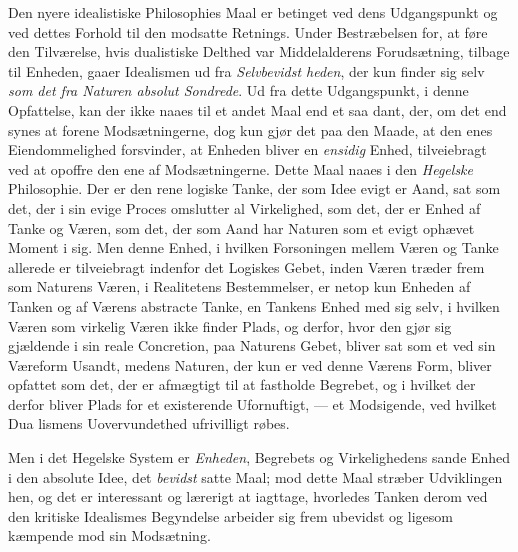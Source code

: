 Den nyere idealistiske Philosophies Maal er betinget ved
dens Udgangspunkt og ved dettes Forhold til den modsatte
Retnings. Under Bestræbelsen for, at føre den Tilværelse,
hvis dualistiske Delthed var Middelalderens Forudsætning,
tilbage til Enheden, gaaer Idealismen ud fra \emph{Selvbevidst\-%
heden}, der kun finder sig selv \emph{som det fra Naturen
absolut Sondrede}. Ud fra dette Udgangspunkt, i denne
Opfattelse, kan der ikke naaes til et andet Maal end et saa\-%
dant, der, om det end synes at forene Modsætningerne, dog
kun gjør det paa den Maade, at den enes Eiendommelighed
forsvinder, at Enheden bliver en \emph{ensidig} Enhed, tilveiebragt
ved at opoffre den ene af Modsætningerne. Dette Maal naaes
i den \emph{Hegelske} Philosophie. Der er den rene logiske Tanke,
der som Idee evigt er Aand, sat som det, der i sin evige
Proces omslutter al Virkelighed, som det, der er Enhed af
Tanke og Væren, som det, der som Aand har Naturen som
et evigt ophævet Moment i sig. Men denne Enhed, i hvilken
Forsoningen mellem Væren og Tanke allerede er tilveiebragt
indenfor det Logiskes Gebet, inden Væren træder frem som
Naturens Væren, i Realitetens Bestemmelser, er netop kun
Enheden af Tanken og af Værens abstracte Tanke, en Tankens
Enhed med sig selv, i hvilken Væren som virkelig Væren ikke
finder Plads, og derfor, hvor den gjør sig gjældende i sin reale
Concretion, paa Naturens Gebet, bliver sat som et ved sin
 Væreform Usandt, medens Naturen, der kun er ved denne
Værens Form, bliver opfattet som det, der er afmægtigt til
at fastholde Begrebet, og i hvilket der derfor bliver Plads for
et existerende Ufornuftigt, --- et Modsigende, ved hvilket Dua\-%
lismens Uovervundethed ufrivilligt røbes.

Men i det Hegelske System er \emph{Enheden}, Begrebets
og Virkelighedens sande Enhed i den absolute Idee, det
\emph{bevidst} satte Maal; mod dette Maal stræber Udviklingen hen,
og det er interessant og lærerigt at iagttage, hvorledes Tanken
derom ved den kritiske Idealismes Begyndelse arbeider sig frem
ubevidst og ligesom kæmpende mod sin Modsætning.

